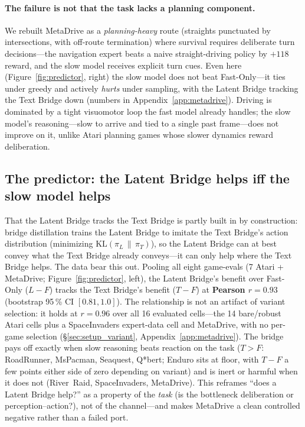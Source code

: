 \documentclass[11pt]{article}
\begin{document}
\paragraph{The failure is not that the task lacks a planning component.}
We rebuilt MetaDrive as a \emph{planning-heavy} route (straights punctuated by intersections,
with off-route termination) where survival requires deliberate turn decisions---the
navigation expert beats a naive straight-driving policy by $+118$ reward, and the slow model
receives explicit turn cues. Even here (Figure~\ref{fig:predictor}, right) the slow model does not
beat Fast-Only---it ties under greedy and actively \emph{hurts} under sampling, with the Latent
Bridge tracking the Text Bridge down (numbers in Appendix~\ref{app:metadrive}). Driving is dominated
by a tight visuomotor loop the fast model already handles; the slow model's reasoning---slow to
arrive and tied to a single past frame---does not improve on it, unlike Atari planning games whose
slower dynamics reward deliberation.

\subsection{The predictor: the Latent Bridge helps iff the slow model helps}
\label{sec:predictor_stmt}

That the Latent Bridge tracks the Text Bridge is partly built in by construction: bridge
distillation trains the Latent Bridge to imitate the
Text Bridge's action distribution (minimizing $\mathrm{KL}(\pi_L\,\|\,\pi_T)$), so the Latent Bridge
can at best convey what the Text Bridge already conveys---it can only help where the Text Bridge
helps. The data bear this out. Pooling all eight game-evals (7 Atari + MetaDrive;
Figure~\ref{fig:predictor}, left), the Latent Bridge's benefit over Fast-Only ($L\!-\!F$) tracks
the Text Bridge's benefit ($T\!-\!F$) at \textbf{Pearson $r=0.93$} (bootstrap 95\,\% CI
$[0.81,1.0]$). The relationship is not an artifact of variant selection: it holds at $r=0.96$ over
all 16 evaluated cells---the 14 bare/robust Atari cells plus a SpaceInvaders expert-data cell and
MetaDrive, with no per-game selection (\S\ref{sec:setup_variant}, Appendix~\ref{app:metadrive}). The bridge pays off exactly
when slow reasoning beats reaction on the task ($T\!>\!F$: RoadRunner, MsPacman, Seaquest,
Q*bert; Enduro sits at floor, with $T\!-\!F$ a few points either side of zero depending on
variant) and is inert or harmful when it does not (River~Raid, SpaceInvaders, MetaDrive). This
reframes ``does a Latent Bridge help?'' as a property of the \emph{task} (is the bottleneck
deliberation or perception--action?), not of the channel---and makes MetaDrive a clean
controlled negative rather than a failed port.
\end{document}
